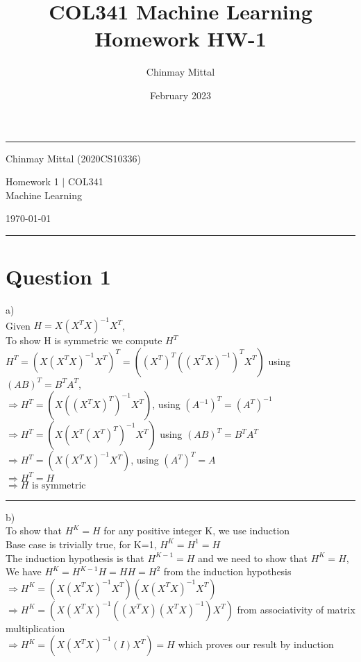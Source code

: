 \documentclass{article}
\title{COL341 Machine Learning Homework HW-1}
\author{Chinmay Mittal}
\date{February 2023}
\begin{document}
\hrule \medskip %
\begin{minipage}{0.295\textwidth} 
\raggedright
\footnotesize
\large
Chinmay Mittal (2020CS10336)
\end{minipage}
\begin{minipage}{0.4\textwidth} 
\centering 
\large 
Homework 1 $\vert$ COL341 \\ 
Machine Learning\\ 
\end{minipage}
\begin{minipage}{0.295\textwidth} 
\raggedleft
\today\hfill\\
\end{minipage}
\medskip\hrule 
\bigskip


\section*{Question 1}
a) \\ 
Given $H = X(X^TX)^{-1}X^T$, 
\\
To show H is symmetric we compute $H^T$
\\
$H^T = (X(X^TX)^{-1}X^{T})^T = ((X^T)^T ((X^T X)^{-1})^T X^T)$ using $(AB)^T = B^T A^T$, 
\\
$ \Rightarrow H^T = (X ((X^T X)^{T})^{-1} X^T )$, using $(A^{-1})^T = (A^T)^{-1}$ \\
$\Rightarrow H^T = (X (X^T (X^T)^T)^{-1} X^T )$ using $(AB)^T = B^TA^T$ \\ 
$\Rightarrow H^T = (X (X^T X)^{-1} X^T )$, using $(A^T)^T=A$ \\
$\Rightarrow H^T = H$ \\
$\Rightarrow H \text{ is symmetric}$

\par\noindent\rule{\textwidth}{0.4pt}

b)  \\ 
To show that $H^K=H$ for any positive integer K, we use induction \\
Base case is trivially true, for K=1, $H^K=H^1=H$ \\ 
The induction hypothesis is that $H^{K-1}=H$ and we need to show that $H^K=H$,
\\
We have $H^K = H^{K-1}H = HH = H^2$ from the induction hypothesis \\ 
$\Rightarrow H^K = (X(X^TX)^{-1}X^T)(X(X^TX)^{-1}X^T)$ \\ 
$\Rightarrow H^K = (X(X^TX)^{-1}((X^TX)(X^TX)^{-1})X^T)$  from associativity of matrix multiplication\\
$ \Rightarrow H^K = (X(X^TX)^{-1}(I)X^T) = H $ which proves our result by induction
\end{document}
